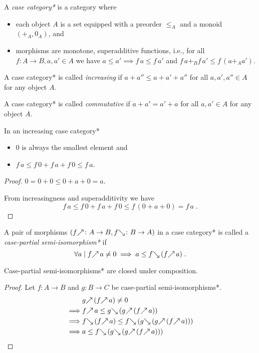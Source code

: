 \documentclass[runningheads,envcountsame]{llncs}
\begin{document}
\begin{definition}
    A \emph{case category*} is a category where 
    \begin{itemize}
        \item each object $A$ is a set equipped with a preorder $\leq_A$ and a monoid $(+_A, 0_A)$, and
        \item morphisms are monotone, superadditive functions, i.e., for all $f\colon A \to B, a, a' \in A$ we have $a \leq a' \implies f\,a \leq f\,a'$ and $f\,a +_B f\,a' \leq f\,(a +_A a')$.
    \end{itemize}
    
    A case category* is called \emph{increasing} if $a + a'' \leq a + a' + a''$ for all $a, a', a'' \in A$ for any object $A$.
    
    A case category* is called \emph{commutative} if $a + a' = a' + a$ for all $a, a' \in A$ for any object $A$.
\end{definition}

\begin{lemma}
    In an increasing case category* 
    \begin{itemize}
        \item $0$ is always the smallest element and
        \item $f\,a \leq f\,0 + f\,a + f\,0 \leq f\,a$.
    \end{itemize}
\end{lemma}
\begin{proof}
    $0 = 0 + 0 \leq 0 + a + 0 = a$.
    
    From increasingness and superadditivity we have
    \[ 
    f\,a \leq f\,0 + f\,a + f\,0 \leq f\,(0 + a + 0) = f\,a\;.
    \]
\end{proof}

\begin{definition}
    A pair of morphisms $(\f{f}\colon A \to B, \b{f}\colon B \to A)$ in a case category* is called a \emph{case-partial semi-isomorphism*} if
    \[ \forall a \mid \f{f}\,a \neq 0 \implies a \leq \b{f}\,(\f{f}\,a) \;. \]
\end{definition}

\begin{lemma}
    Case-partial semi-isomorphisms* are closed under composition.
\end{lemma}
\begin{proof}
    Let $f\colon A \to B$ and $g\colon B \to C$ be case-partial semi-isomorphisms*.
    \begin{align}
        & \f{g}\,(\f{f}\,a) \neq 0 \\
    \implies & \f{f}\,a \leq \b{g}\,(\f{g}\,(\f{f}\,a)) \\
    \implies & \b{f}\,(\f{f}\,a) \leq \b{f}\,(\b{g}\,(\f{g}\,(\f{f}\,a))) \\
    \implies & a \leq \b{f}\,(\b{g}\,(\f{g}\,(\f{f}\,a)))
    \end{align}
\end{proof}
\end{document}
